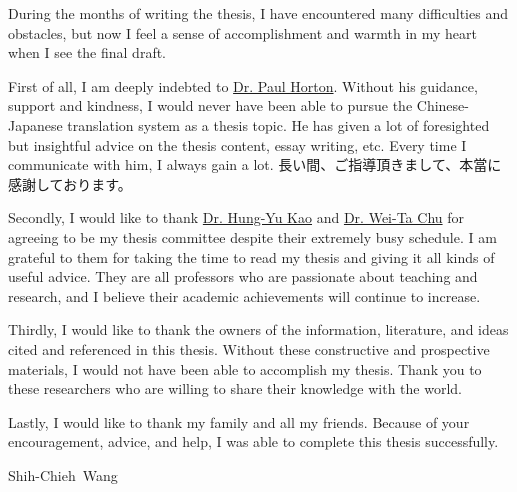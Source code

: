 \begin{CJK}{UTF8}{ipxm}
    During the months of writing the thesis, I have encountered many difficulties and obstacles, but now I feel a sense of accomplishment and warmth in my heart when I see the final draft.

    First of all, I am deeply indebted to \href{https://paulhorton.gitlab.io/}{Dr. Paul Horton}. Without his guidance, support and kindness, I would never have been able to pursue the Chinese-Japanese translation system as a thesis topic. He has given a lot of foresighted but insightful advice on the thesis content, essay writing, etc. Every time I communicate with him, I always gain a lot. 長い間、ご指導頂きまして、本當に感謝しております。
    
    Secondly, I would like to thank \href{https://ikmlab.csie.ncku.edu.tw/advisor.html}{Dr. Hung-Yu Kao} and \href{http://mmcv.csie.ncku.edu.tw/~wtchu/}{Dr. Wei-Ta Chu} for agreeing to be my thesis committee despite their extremely busy schedule. I am grateful to them for taking the time to read my thesis and giving it all kinds of useful advice. They are all professors who are passionate about teaching and research, and I believe their academic achievements will continue to increase.
    
    Thirdly, I would like to thank the owners of the information, literature, and ideas cited and referenced in this thesis. Without these constructive and prospective materials, I would not have been able to accomplish my thesis. Thank you to these researchers who are willing to share their knowledge with the world.
    
    Lastly, I would like to thank my family and all my friends. Because of your encouragement, advice, and help, I was able to complete this thesis successfully. 
\end{CJK}

\begin{flushright}
\mbox{Shih-Chieh Wang}
\end{flushright}